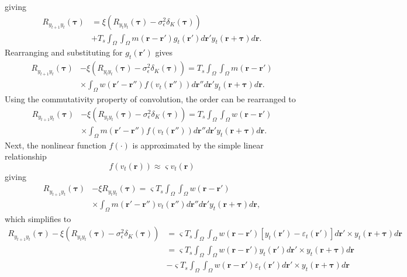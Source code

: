 \documentclass[]{article}
\begin{document}
giving 
\begin{align}
	R_{y_{t+1}y_t}(\boldsymbol{\tau}) &= \xi \left(R_{y_ty_t}(\boldsymbol{\tau})-\sigma_{\epsilon}^2  \delta_{K}\left(\boldsymbol\tau\right)\right)\nonumber \\
	&+ T_s \int_{\Omega}\int_{\Omega} m(\mathbf{r}-\mathbf{r}')  g_t(\mathbf{r}') d\mathbf{r}' y_t(\mathbf{r}+\boldsymbol{\tau}) d\mathbf{r}.
\end{align}
Rearranging and substituting  for $g_t(\mathbf{r}')$ gives
\begin{align}
	R_{y_{t+1}y_t}(\boldsymbol{\tau}) &-\xi \left(R_{y_ty_t}(\boldsymbol{\tau})-\sigma_{\epsilon}^2  \delta_{K}\left(\boldsymbol\tau\right)\right) = T_s \int_{\Omega}\int_{\Omega} m(\mathbf{r}-\mathbf{r}') \nonumber \\
	&\times \int_{\Omega} w(\mathbf{r}'-\mathbf{r}'') f\left(v_t(\mathbf{r}'')\right)d\mathbf{r}'' d\mathbf{r}' y_t(\mathbf{r}+\boldsymbol{\tau}) d\mathbf{r}. 
\end{align}  
Using the commutativity property of convolution, the order can be rearranged to
\begin{align}
	R_{y_{t+1}y_t}(\boldsymbol{\tau})&-\xi \left(R_{y_ty_t}(\boldsymbol{\tau})-\sigma_{\epsilon}^2  \delta_{K}\left(\boldsymbol\tau\right)\right) =  T_s \int_{\Omega}\int_{\Omega} w(\mathbf{r}-\mathbf{r}') \nonumber \\
	&\times \int_{\Omega} m(\mathbf{r}'-\mathbf{r}'') f\left(v_t(\mathbf{r}'')\right) d\mathbf{r}'' d\mathbf{r}' y_t(\mathbf{r}+\boldsymbol{\tau}) d\mathbf{r}.
\end{align}
Next, the nonlinear function $f(\cdot)$ is approximated by the simple linear relationship
\begin{equation}
	f\left(v_t(\mathbf{r})\right) \approx \varsigma v_t(\mathbf{r})
\end{equation} 
giving
\begin{align}
	R_{y_{t+1}y_t}(\boldsymbol{\tau})&-\xi R_{y_ty_t}(\boldsymbol{\tau}) =  \varsigma T_s \int_{\Omega}\int_{\Omega} w(\mathbf{r}-\mathbf{r}') \nonumber \\
	&\times \int_{\Omega} m(\mathbf{r}'-\mathbf{r}'')  v_t(\mathbf{r}'') d\mathbf{r}'' d\mathbf{r}' y_t(\mathbf{r}+\boldsymbol{\tau}) d\mathbf{r},
\end{align}
which simplifies to
\begin{align}
	R_{y_{t+1}y_t}(\boldsymbol{\tau})-\xi \left(R_{y_ty_t}(\boldsymbol{\tau})-\sigma_{\epsilon}^2  \delta_{K}\left(\boldsymbol\tau\right)\right)& =  \varsigma T_s \int_{\Omega}\int_{\Omega} w(\mathbf{r}-\mathbf{r}')\left[ y_t(\mathbf{r}')-\varepsilon_t(\mathbf r')\right]  d\mathbf{r}' \times y_t(\mathbf{r}+\boldsymbol{\tau}) d\mathbf{r} \nonumber \\
	&=\varsigma T_s \int_{\Omega}\int_{\Omega} w(\mathbf{r}-\mathbf{r}') y_t(\mathbf{r}') d\mathbf{r}' \times y_t(\mathbf{r}+\boldsymbol{\tau}) d\mathbf{r} \nonumber \\
        &-\varsigma T_s \int_{\Omega}\int_{\Omega} w(\mathbf{r}-\mathbf{r}')\varepsilon_t(\mathbf r') d\mathbf{r}' \times y_t(\mathbf{r}+\boldsymbol{\tau}) d\mathbf{r}
\end{align}
\end{document}
